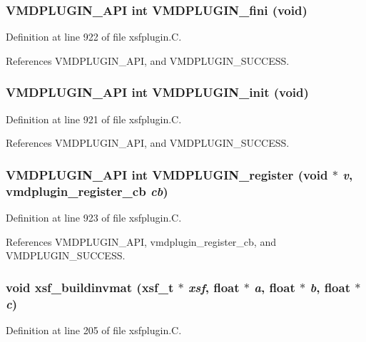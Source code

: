 \subsubsection{\setlength{\rightskip}{0pt plus 5cm}VMDPLUGIN\_\-API int VMDPLUGIN\_\-fini (void)}\label{xsfplugin_8C_a45}




Definition at line 922 of file xsfplugin.C.

References VMDPLUGIN\_\-API, and VMDPLUGIN\_\-SUCCESS.
\subsubsection{\setlength{\rightskip}{0pt plus 5cm}VMDPLUGIN\_\-API int VMDPLUGIN\_\-init (void)}\label{xsfplugin_8C_a44}




Definition at line 921 of file xsfplugin.C.

References VMDPLUGIN\_\-API, and VMDPLUGIN\_\-SUCCESS.
\subsubsection{\setlength{\rightskip}{0pt plus 5cm}VMDPLUGIN\_\-API int VMDPLUGIN\_\-register (void $\ast$ {\em v}, {\bf vmdplugin\_\-register\_\-cb} {\em cb})}\label{xsfplugin_8C_a46}




Definition at line 923 of file xsfplugin.C.

References VMDPLUGIN\_\-API, vmdplugin\_\-register\_\-cb, and VMDPLUGIN\_\-SUCCESS.
\subsubsection{\setlength{\rightskip}{0pt plus 5cm}void xsf\_\-buildinvmat ({\bf xsf\_\-t} $\ast$ {\em xsf}, float $\ast$ {\em a}, float $\ast$ {\em b}, float $\ast$ {\em c})\hspace{0.3cm}{\tt  [static]}}\label{xsfplugin_8C_a35}




Definition at line 205 of file xsfplugin.C.

